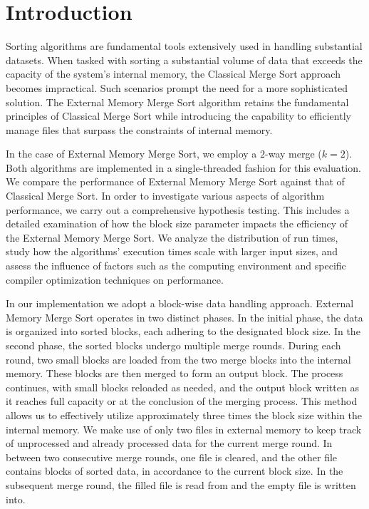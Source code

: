 \documentclass[twocolumn]{article}
\begin{document}
\section{Introduction}

Sorting algorithms are fundamental tools extensively used in handling substantial datasets.
When tasked with sorting a substantial volume of data that exceeds the capacity of the system's internal memory, the Classical Merge Sort approach becomes impractical.
Such scenarios prompt the need for a more sophisticated solution. The External Memory Merge Sort algorithm retains the fundamental principles of Classical Merge Sort while introducing
the capability to efficiently manage files that surpass the constraints of internal memory.

In the case of External Memory Merge Sort, we employ a \(2\)-way merge (\( k = 2 \)). Both algorithms are implemented in a single-threaded fashion for this evaluation.
We compare the performance of External Memory Merge Sort against that of Classical Merge Sort.
In order to investigate various aspects of algorithm performance, we carry out a comprehensive hypothesis testing.
This includes a detailed examination of how the block size parameter impacts the efficiency of the External Memory Merge Sort.
We analyze the distribution of run times, study how the algorithms' execution times scale with larger input sizes, and assess the influence of factors such as the computing
environment and specific compiler optimization techniques on performance.

In our implementation we adopt a block-wise data handling approach. External Memory Merge Sort operates in two distinct phases.
In the initial phase, the data is organized into sorted blocks, each adhering to the designated block size.
In the second phase, the sorted blocks undergo multiple merge rounds. During each round, two small blocks are loaded from the two merge blocks into the internal memory.
These blocks are then merged to form an output block. The process continues, with small blocks reloaded as needed, and the output block written as it reaches full capacity or
at the conclusion of the merging process. This method allows us to effectively utilize approximately three times the block size within the internal memory.
We make use of only two files in external memory to keep track of unprocessed and already processed data for the current merge round.
In between two consecutive merge rounds, one file is cleared, and the other file contains blocks of sorted data, in accordance to the current block size.
In the subsequent merge round, the filled file is read from and the empty file is written into.
\end{document}
